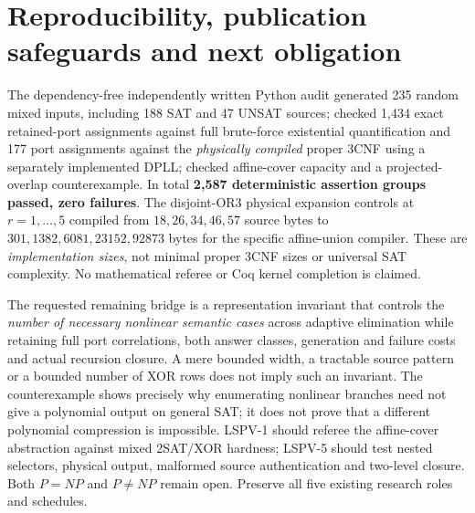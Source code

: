 \documentclass[11pt]{article}
\begin{document}
\section{Reproducibility, publication safeguards and next obligation}
The dependency-free independently written Python audit generated 235 random mixed inputs, including 188 SAT and 47 UNSAT sources; checked 1,434 exact retained-port assignments against full brute-force existential quantification and 177 port assignments against the \emph{physically compiled} proper 3CNF using a separately implemented DPLL; checked affine-cover capacity and a projected-overlap counterexample. In total \textbf{2,587 deterministic assertion groups passed, zero failures}. The disjoint-OR3 physical expansion controls at $r=1,\ldots,5$ compiled from $18,26,34,46,57$ source bytes to $301,1382,6081,23152,92873$ bytes for the specific affine-union compiler. These are \emph{implementation sizes}, not minimal proper 3CNF sizes or universal SAT complexity. No mathematical referee or Coq kernel completion is claimed.

The requested remaining bridge is a representation invariant that controls the \emph{number of necessary nonlinear semantic cases} across adaptive elimination while retaining full port correlations, both answer classes, generation and failure costs and actual recursion closure. A mere bounded width, a tractable source pattern or a bounded number of XOR rows does not imply such an invariant. The counterexample shows precisely why enumerating nonlinear branches need not give a polynomial output on general SAT; it does not prove that a different polynomial compression is impossible. LSPV-1 should referee the affine-cover abstraction against mixed 2SAT/XOR hardness; LSPV-5 should test nested selectors, physical output, malformed source authentication and two-level closure. Both $P=NP$ and $P\ne NP$ remain open. Preserve all five existing research roles and schedules.



\end{document}
